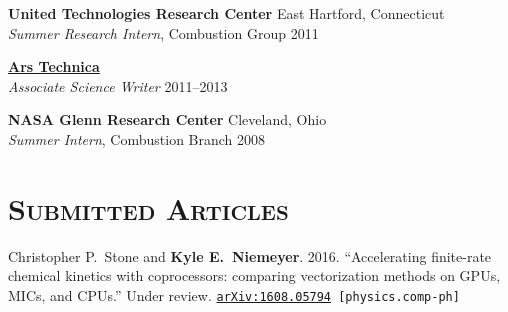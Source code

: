 \documentclass[margin,line,11pt]{res}
\makeatletter
\newlength{\bibhang}
\newlength{\bibsep}
 {\@listi \global\bibsep\itemsep \global\advance\bibsep by\parsep}
\newenvironment{bibenum*}
  {\renewcommand\labelenumi{\theenumi.}%
   \etaremune[
     topsep=0pt,
     itemsep=\bibsep,
     parsep=0pt,partopsep=0pt,
     itemindent=-\bibhang,
     leftmargin={\bibhang+\widthof{[999]}}]}
  {\endetaremune}
\makeatother
\begin{document}
\begin{resume}
\textbf{United Technologies Research Center} \hfill East Hartford, Connecticut \\
\emph{Summer Research Intern}, Combustion Group \hfill 2011

\textbf{\href{http://arstechnica.com/}{Ars Technica}} \\
\emph{Associate Science Writer} \hfill 2011--2013

\textbf{NASA Glenn Research Center} \hfill Cleveland, Ohio \\
\emph{Summer Intern}, Combustion Branch \hfill 2008

\section{\textsc{Submitted Articles}}

\begin{bibenum*}

\item Christopher P.~Stone and \textbf{Kyle E.~Niemeyer}.
2016.
``Accelerating finite-rate chemical kinetics with coprocessors: comparing vectorization methods on GPUs, MICs, and CPUs.''
Under review. {\tt \href{http://arxiv.org/abs/1608.05794}{arXiv:1608.05794} [physics.comp-ph]}



\end{bibenum*}
\end{resume}
\end{document}
